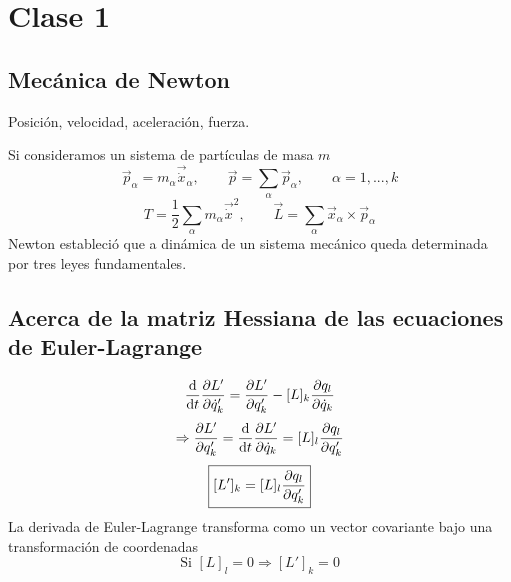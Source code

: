 \section{Clase 1}
\subsection{Mecánica de Newton}
Posición, velocidad, aceleración, fuerza.

Si consideramos un sistema de partículas de masa $m$
\begin{equation}
  \vec{p}_\alpha =m_\alpha \vec{\dot{x}}_\alpha,\qquad \vec{p}=\sum_\alpha \vec{p}_\alpha,\qquad \alpha=1,...,k
\end{equation}
\begin{equation}
  T=\frac{1}{2}\sum_\alpha m_\alpha \vec{\dot{x}}^2,\qquad \vec{L}=\sum_\alpha \vec{x}_\alpha\times \vec{p}_\alpha
\end{equation}
Newton estableció que a dinámica de un sistema mecánico queda	determinada por tres leyes fundamentales.






\subsection{Acerca de la matriz Hessiana de las ecuaciones de Euler-Lagrange}
\begin{equation}
  \dv{t}\pdv{L'}{\dot{q}'_k}=\pdv{L'}{q'_k}-[L]_k\pdv{q_l}{\dot{q}_k}
\end{equation}
\begin{equation}
  \Rightarrow \pdv{L'}{q'_k}=\dv{t}\pdv{L'}{\dot{q}_k}=[L]_l\pdv	{q_l}{q'_k}
\end{equation}
\begin{equation}
\boxed{[L']_k=[L]_l\pdv{q_l}{q'_k}}
\end{equation}
La derivada de Euler-Lagrange transforma como un vector covariante bajo una transformación de coordenadas
\begin{equation}
  \mbox{Si }[L]_l=0 \Rightarrow [L']_k=0
\end{equation}


